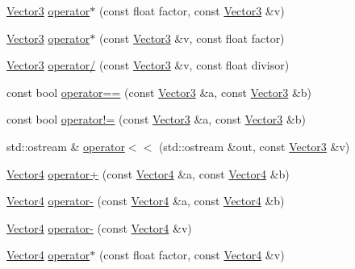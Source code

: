 \begin{DoxyCompactItemize}
\item 
\hyperlink{classprism_1_1geometry_1_1_vector3}{Vector3} \hyperlink{namespaceprism_1_1geometry_aa51af06dd0e6b94f88a5279fbc0aaabf}{operator$\ast$} (const float factor, const \hyperlink{classprism_1_1geometry_1_1_vector3}{Vector3} \&v)
\item 
\hyperlink{classprism_1_1geometry_1_1_vector3}{Vector3} \hyperlink{namespaceprism_1_1geometry_aad92d074dda405d1018cfbdead0cb482}{operator$\ast$} (const \hyperlink{classprism_1_1geometry_1_1_vector3}{Vector3} \&v, const float factor)
\item 
\hyperlink{classprism_1_1geometry_1_1_vector3}{Vector3} \hyperlink{namespaceprism_1_1geometry_ad02dc8b031ae8dbb60a2a296d42e1076}{operator/} (const \hyperlink{classprism_1_1geometry_1_1_vector3}{Vector3} \&v, const float divisor)
\item 
const bool \hyperlink{namespaceprism_1_1geometry_a9e81df586be8ba87611ec1ce1c986c25}{operator==} (const \hyperlink{classprism_1_1geometry_1_1_vector3}{Vector3} \&a, const \hyperlink{classprism_1_1geometry_1_1_vector3}{Vector3} \&b)
\item 
const bool \hyperlink{namespaceprism_1_1geometry_a87f7b46d030f78614322cd46292b7d1a}{operator!=} (const \hyperlink{classprism_1_1geometry_1_1_vector3}{Vector3} \&a, const \hyperlink{classprism_1_1geometry_1_1_vector3}{Vector3} \&b)
\item 
std\+::ostream \& \hyperlink{namespaceprism_1_1geometry_aa399ba3127f6f0926120f2b0225f080e}{operator$<$$<$} (std\+::ostream \&out, const \hyperlink{classprism_1_1geometry_1_1_vector3}{Vector3} \&v)
\item 
\hyperlink{classprism_1_1geometry_1_1_vector4}{Vector4} \hyperlink{namespaceprism_1_1geometry_a517ae80d290f5003ca27b3e409009c6d}{operator+} (const \hyperlink{classprism_1_1geometry_1_1_vector4}{Vector4} \&a, const \hyperlink{classprism_1_1geometry_1_1_vector4}{Vector4} \&b)
\item 
\hyperlink{classprism_1_1geometry_1_1_vector4}{Vector4} \hyperlink{namespaceprism_1_1geometry_ad78caaf605c536f6edbc35c74c642f32}{operator-\/} (const \hyperlink{classprism_1_1geometry_1_1_vector4}{Vector4} \&a, const \hyperlink{classprism_1_1geometry_1_1_vector4}{Vector4} \&b)
\item 
\hyperlink{classprism_1_1geometry_1_1_vector4}{Vector4} \hyperlink{namespaceprism_1_1geometry_ab50ea80e85571fdcbaaff4b07fc1c872}{operator-\/} (const \hyperlink{classprism_1_1geometry_1_1_vector4}{Vector4} \&v)
\item 
\hyperlink{classprism_1_1geometry_1_1_vector4}{Vector4} \hyperlink{namespaceprism_1_1geometry_a4c06f5239ea45456a85667f086e1d8a0}{operator$\ast$} (const float factor, const \hyperlink{classprism_1_1geometry_1_1_vector4}{Vector4} \&v)

\end{DoxyCompactItemize}
